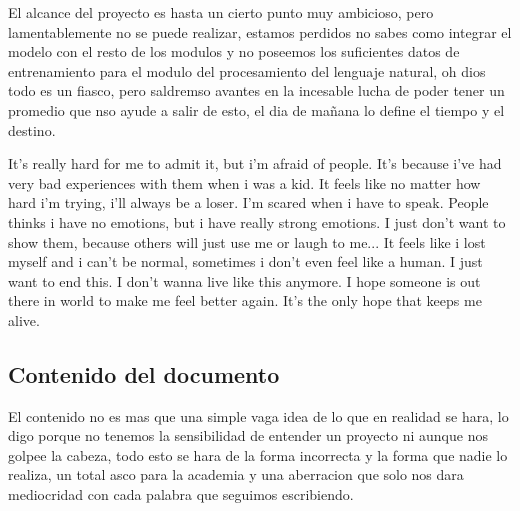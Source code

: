 El alcance del proyecto es hasta un cierto punto muy ambicioso, pero lamentablemente no se puede realizar, estamos perdidos no sabes como integrar el modelo con el resto de los modulos y no poseemos los suficientes datos de entrenamiento para el modulo del procesamiento del lenguaje natural, oh dios todo es un fiasco, pero saldremso avantes en la incesable lucha de poder tener un promedio que nso ayude a salir de esto, el dia de mañana lo define el tiempo y el destino.

It's really hard for me to admit it, but i'm afraid of people. It's because i've had very bad experiences with them when i was a kid. It feels like no matter how hard i'm trying, i'll always be a loser. I'm scared when i have to speak. People thinks i have no emotions, but i have really strong emotions. I just don't want to show them, because others will just use me or laugh to me... It feels like i lost myself and i can't be normal, sometimes i don't even feel like a human. I just want to end this. I don't wanna live like this anymore. I hope someone is out there in world to make me feel better again. It's the only hope that keeps me alive.

\subsection{Contenido del documento}

El contenido no es mas que una simple vaga idea de lo que en realidad se hara, lo digo porque no tenemos la sensibilidad de entender un proyecto ni aunque nos golpee la cabeza, todo esto se hara de la forma incorrecta y la forma que nadie lo realiza, un total asco para la academia y una aberracion que solo nos dara mediocridad con cada palabra que seguimos escribiendo.